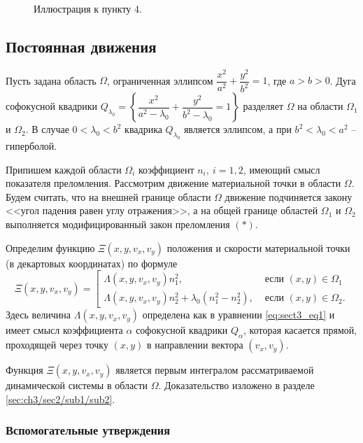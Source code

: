 \begin{figure}[!htb]
    \caption{Иллюстрация к пункту 4.}
    \label{fig:pt8:_example3}
\endminipage\hfill
\end{figure}

\subsection{Постоянная движения}\label{sec:ch3/sec2/sub1}
Пусть задана область $\Omega$, ограниченная эллипсом 
$\dfrac{x^2}{a^2} + \dfrac{y^2}{b^2} = 1$, где $a > b > 0$.
Дуга софокусной квадрики $Q_{\lambda_0} = \left\{ \dfrac{x^2}{a^2-\lambda_0} + \dfrac{y^2}{b^2-\lambda_0} = 1 \right\}$ разделяет  $\Omega$ на области $\Omega_1$ и $\Omega_2$.
В случае $0 < \lambda_0 < b^2$ квадрика $Q_{\lambda_0}$ является эллипсом, а при $b^2 < \lambda_0 < a^2$ -- гиперболой.

Припишем каждой области $\Omega_i$  коэффициент $n_i,\  i=1,2$, имеющий смысл показателя преломления. 
Рассмотрим движение материальной точки в области $\Omega$. Будем считать, что на внешней границе области $\Omega$ движение подчиняется закону <<угол падения равен углу отражения>>, 
а на общей границе областей $\Omega_1$ и $\Omega_2$ выполняется модифицированный закон преломления $(\ast)$.

Определим функцию $\Xi(x, y, v_x, v_y)$ положения и скорости материальной точки (в декартовых координатах) по формуле
\begin{equation}
\Xi(x, y, v_x, v_y) = \left[
\begin{array}{ll}
    \Lambda(x, y, v_x, v_y) n_1^2, &  \text{ если } (x,y) \in \Omega_1 \\
    \Lambda(x, y, v_x, v_y) n_2^2 + \lambda_0 (n_1^2-n_2^2), & \text{ если } (x,y) \in \Omega_2    .
\end{array}
\right.
\label{eq:xi_integral_definition}
\end{equation}
Здесь величина $\Lambda(x, y, v_x, v_y)$ определена как в уравнении \eqref{eq:sect3_eq1} и имеет смысл коэффициента $\alpha$  софокусной квадрики $Q_\alpha$, которая касается прямой, проходящей через точку $(x,y)$ в направлении вектора $(v_x, v_y)$.

Функция $\Xi(x, y, v_x, v_y)$ является первым интегралом рассматриваемой динамической системы в области $\Omega$.
Доказательство изложено в разделе \ref{sec:ch3/sec2/sub1/sub2}.

\subsubsection{Вспомогательные утверждения}\label{sec:ch3/sec2/sub1/sub1}

